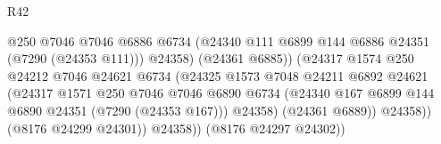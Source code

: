 \begin{lexlean}{R42}
\begin{coremodule}
{                                                @250
                                                @7046
                                                @7046
                                                @6886
                                                @6734
                                                (@24340
                                                  @111
                                                  @6899
                                                  @144
                                                  @6886
                                                  @24351
                                                  (@7290 (@24353 @111)))
                                                @24358)
                                              (@24361 @6885))
                                            (@24317
                                              @1574
                                              @250
                                              @24212
                                              @7046
                                              @24621
                                              @6734
                                              (@24325
                                                @1573
                                                @7048
                                                @24211
                                                @6892
                                                @24621
                                                (@24317
                                                  @1571
                                                  @250
                                                  @7046
                                                  @7046
                                                  @6890
                                                  @6734
                                                  (@24340
                                                    @167
                                                    @6899
                                                    @144
                                                    @6890
                                                    @24351
                                                    (@7290 (@24353 @167)))
                                                  @24358)
                                                (@24361 @6889))
                                              @24358))
                                          (@8176 @24299 @24301))
                                        @24358))
                                    (@8176 @24297 @24302))
}
\end{coremodule}
\end{lexlean}
